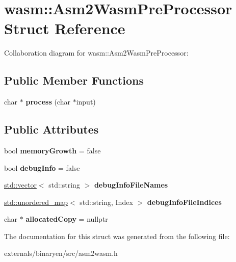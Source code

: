 \hypertarget{structwasm_1_1_asm2_wasm_pre_processor}{}\section{wasm\+:\+:Asm2\+Wasm\+Pre\+Processor Struct Reference}
\label{structwasm_1_1_asm2_wasm_pre_processor}


Collaboration diagram for wasm\+:\+:Asm2\+Wasm\+Pre\+Processor\+:
\subsection*{Public Member Functions}
\begin{DoxyCompactItemize}
\item 
\mbox{\label{structwasm_1_1_asm2_wasm_pre_processor_a03094effe77f125c3b782f83d32d5f52}} 
char $\ast$ {\bfseries process} (char $\ast$input)
\end{DoxyCompactItemize}
\subsection*{Public Attributes}
\begin{DoxyCompactItemize}
\item 
\mbox{\label{structwasm_1_1_asm2_wasm_pre_processor_a5fb648697ffc980ea9f3911ec362c94a}} 
bool {\bfseries memory\+Growth} = false
\item 
\mbox{\label{structwasm_1_1_asm2_wasm_pre_processor_a73263622d41eaa7a14d6b16aba194bf6}} 
bool {\bfseries debug\+Info} = false
\item 
\mbox{\label{structwasm_1_1_asm2_wasm_pre_processor_a241adc6ac69dbae82c04cd64f0d8a092}} 
\mbox{\hyperlink{classstd_1_1vector}{std\+::vector}}$<$ std\+::string $>$ {\bfseries debug\+Info\+File\+Names}
\item 
\mbox{\label{structwasm_1_1_asm2_wasm_pre_processor_a57d35fad4d2e82a75435251162a434d5}} 
\mbox{\hyperlink{classstd_1_1unordered__map}{std\+::unordered\+\_\+map}}$<$ std\+::string, Index $>$ {\bfseries debug\+Info\+File\+Indices}
\item 
\mbox{\label{structwasm_1_1_asm2_wasm_pre_processor_aacde8bc784206f4dfda06f7a0e825fc3}} 
char $\ast$ {\bfseries allocated\+Copy} = nullptr
\end{DoxyCompactItemize}


The documentation for this struct was generated from the following file\+:\begin{DoxyCompactItemize}
\item 
externals/binaryen/src/asm2wasm.\+h\end{DoxyCompactItemize}
